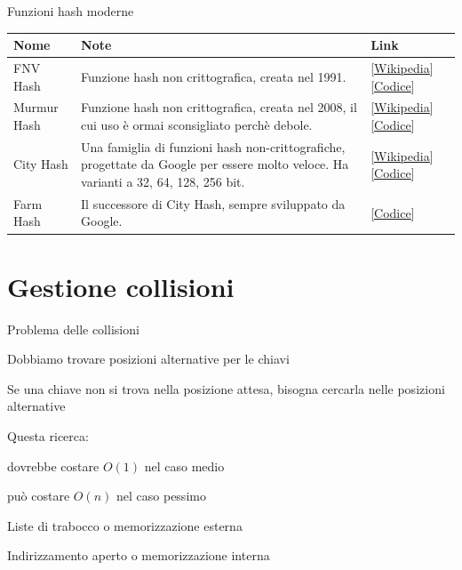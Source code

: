 \begin{frame}{Funzioni hash moderne}
	
{\renewcommand*{\arraystretch}{1.3}
\begin{tabular}{|P{2.5cm}|P{6cm}|P{2cm}|}
\hline
\textbf{Nome} & \textbf{Note} & \textbf{Link}
\\ \hline
FNV Hash & 
Funzione hash non crittografica, creata nel 1991.
&
[\href{https://en.wikipedia.org/wiki/Fowler-Noll-Vo_hash_function}{\alert{\underline{Wikipedia}}}]
[\href{http://isthe.com/chongo/tech/comp/fnv/}{\alert{\underline{Codice}}}]
\\ \hline
Murmur Hash &
Funzione hash non crittografica, creata nel 2008, il cui uso è ormai sconsigliato
perchè debole.
&
[\href{https://en.wikipedia.org/wiki/MurmurHash}{\alert{\underline{Wikipedia}}}]
[\href{https://github.com/aappleby/smhasher/}{\alert{\underline{Codice}}}]
\\ \hline
City Hash &
Una famiglia di funzioni hash non-crittografiche, progettate
da Google per essere molto veloce. Ha varianti a 32, 64, 128, 256 bit.
&
[\href{https://en.wikipedia.org/wiki/CityHash}{\alert{\underline{Wikipedia}}}]
[\href{https://github.com/google/cityhash/}{\alert{\underline{Codice}}}]
\\ \hline
Farm Hash &
Il successore di City Hash, sempre sviluppato da Google.
&
[\href{https://github.com/google/farmhash/}{\alert{\underline{Codice}}}]
\\ \hline
\end{tabular}
}
\end{frame}


\section{Gestione collisioni}


\begin{frame}{Problema delle collisioni}
	
\vspace{-9pt}
\BI
\item Dobbiamo trovare posizioni alternative per le chiavi
\item Se una chiave non si trova nella posizione attesa, bisogna cercarla nelle posizioni alternative
\item Questa ricerca:
  \BI
	\item dovrebbe costare $O(1)$ nel caso medio
	\item può costare $O(n)$ nel caso pessimo
	\EI
\EI

\BI
\item \alert{Liste di trabocco} o memorizzazione esterna
\item \alert{Indirizzamento aperto} o memorizzazione interna
\EI

\end{frame}

